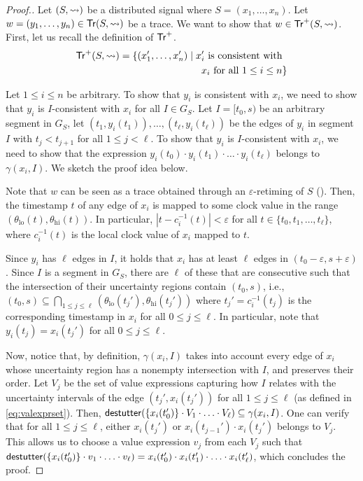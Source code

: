 \begin{proof}[\normalsize Proof.]
	\normalsize
	Let $(S,{\rightsquigarrow})$ be a distributed signal where $S = (x_1, \ldots, x_n)$.
	Let $w = (y_1, \ldots, y_n) \in \mathsf{Tr}(S,{\rightsquigarrow})$ be a trace.
	We want to show that $w \in \mathsf{Tr}^+(S,{\rightsquigarrow})$.
	First, let us recall the definition of $\mathsf{Tr}^+$.
	\begin{align*}
		\tr^+(S,{\hb}) = \{ (x_1', \ldots, x_n') \st \text{$x_i'$ is consistent with}&\\
		\text{$x_i$ for all $1 \leq i \leq n$}&\} 
	\end{align*}

	Let $1 \leq i \leq n$ be arbitrary.
	To show that $y_i$ is consistent with $x_i$, we need to show that $y_i$ is $I$-consistent with $x_i$ for all $I \in G_S$.
	Let $I = [t_0, s)$ be an arbitrary segment in $G_S$, let $(t_1, y_i(t_1)), \ldots, (t_\ell, y_i(t_\ell))$ be the edges of $y_i$ in segment $I$ with $t_j < t_{j+1}$ for all $1 \leq j < \ell$.
	To show that $y_i$ is $I$-consistent with $x_i$, we need to show that the expression $y_i(t_0) \cdot y_i(t_1) \cdot \ldots \cdot y_i(t_\ell)$ belongs to $\gamma(x_i,I)$.
	We sketch the proof idea below.
	
	Note that $w$ can be seen as a trace obtained through an $\varepsilon$-retiming of $S$ (\cite[Section 4.2]{MomtazAB23}).
	Then, the timestamp $t$ of any edge of $x_i$ is mapped to some clock value in the range $(\theta_{\text{lo}}(t), \theta_{\text{hi}}(t))$.
	In particular, $|t - c^{-1}_i(t)| < \varepsilon$ for all $t \in \{t_0, t_1, \ldots, t_\ell\}$, where $c^{-1}_i(t)$ is the local clock value of $x_i$ mapped to $t$.
	
	Since $y_i$ has $\ell$ edges in $I$, it holds that $x_i$ has at least $\ell$ edges in $(t_0 - \varepsilon, s + \varepsilon)$.
	Since $I$ is a segment in $G_S$, there are $\ell$ of these that are consecutive such that the intersection of their uncertainty regions contain $(t_0,s)$, i.e., $(t_0,s) \subseteq \bigcap_{1 \leq j \leq \ell} (\theta_{\text{lo}}(t_j'), \theta_{\text{hi}}(t_j'))$ where $t_j' = c^{-1}_i(t_j)$ is the corresponding timestamp in $x_i$ for all $0 \leq j \leq \ell$.
	In particular, note that $y_i(t_j) = x_i(t_j')$ for all $0 \leq j \leq \ell$.
	
	Now, notice that, by definition, $\gamma(x_i, I)$ takes into account every edge of $x_i$ whose uncertainty region has a nonempty intersection with $I$, and preserves their order.
	Let $V_j$ be the set of value expressions capturing how $I$ relates with the uncertainty intervals of the edge $(t_j', x_i(t_j'))$ for all $1 \leq j \leq \ell$ (as defined in \cref{eq:valexprset}).
	Then, $\mathsf{destutter}(\{x_i(t_0')\} \cdot V_1 \cdot \ldots \cdot V_\ell) \subseteq \gamma(x_i, I)$.
	One can verify that for all $1 \leq j \leq \ell$, either $x_i(t_j')$ or $x_i(t_{j-1}') \cdot x_i(t_j')$ belongs to $V_j$.
	This allows us to choose a value expression $v_j$ from each $V_j$ such that $\mathsf{destutter}(\{x_i(t_0')\} \cdot v_1 \cdot \ldots \cdot v_\ell) = x_i(t_0') \cdot x_i(t_1') \cdot \ldots \cdot x_i(t_\ell')$, which concludes the proof. 
	

\end{proof}
